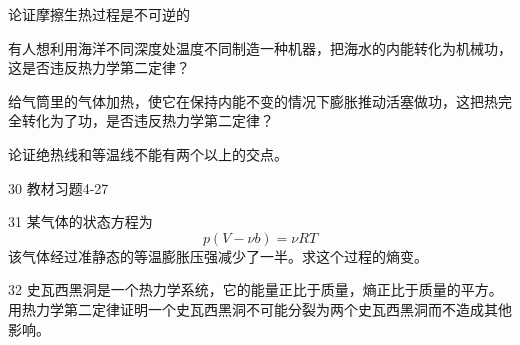 \documentclass[CJK]{beamer}
\begin{document}
\begin{frame}
\bch


\bitem
\item{论证摩擦生热过程是不可逆的}
\eitem

\ech
\end{frame}

\begin{frame}
\bch


\bitem
\item{有人想利用海洋不同深度处温度不同制造一种机器，把海水的内能转化为机械功，这是否违反热力学第二定律？}
\eitem

\ech
\end{frame}


\begin{frame}
\bch


\bitem
\item{给气筒里的气体加热，使它在保持内能不变的情况下膨胀推动活塞做功，这把热完全转化为了功，是否违反热力学第二定律？}
\eitem
\ech
\end{frame}


\begin{frame}
\bch


\bitem
\item{论证绝热线和等温线不能有两个以上的交点。}
\eitem
\ech
\end{frame}


\begin{frame}
\bch

\bitem
\item[30]{教材习题4-27}
\item[31]{某气体的状态方程为
$$p(V- \nu b) = \nu RT$$
该气体经过准静态的等温膨胀压强减少了一半。求这个过程的熵变。}
\item[32]{史瓦西黑洞是一个热力学系统，它的能量正比于质量，熵正比于质量的平方。用热力学第二定律证明一个史瓦西黑洞不可能分裂为两个史瓦西黑洞而不造成其他影响。}
\eitem

\ech
\end{frame}
\end{document}

